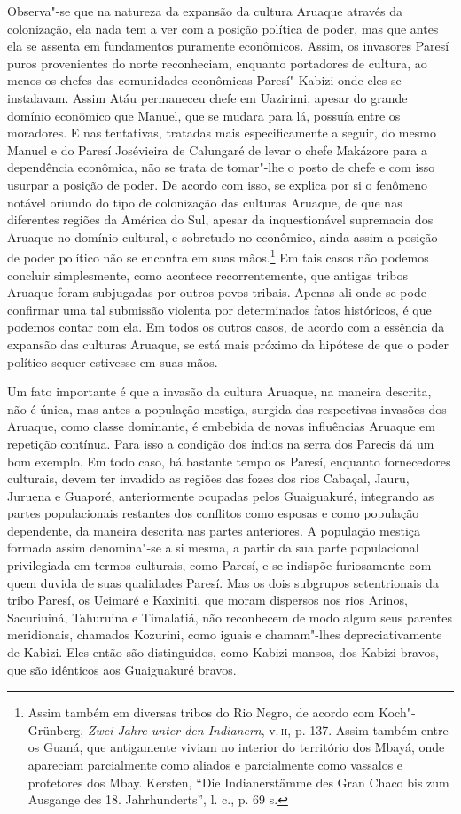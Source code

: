 Observa"-se que na natureza da expansão da cultura Aruaque através da
colonização, ela nada tem a ver com a posição política de poder, mas que
antes ela se assenta em fundamentos puramente econômicos. Assim, os
invasores Paresí puros provenientes do norte reconheciam, enquanto
portadores de cultura, ao menos os chefes das comunidades econômicas
Paresí"-Kabizi onde eles se instalavam. Assim Atáu permaneceu chefe em
Uazirimi, apesar do grande domínio econômico que Manuel, que se mudara
para lá, possuía entre os moradores. E nas tentativas, tratadas mais
especificamente a seguir, do mesmo Manuel e do Paresí Josévieira de
Calungaré de levar o chefe Makázore para a dependência econômica, não se
trata de tomar"-lhe o posto de chefe e com isso usurpar a posição de
poder. De acordo com isso, se explica por si o fenômeno notável oriundo
do tipo de colonização das culturas Aruaque, de que nas diferentes
regiões da América do Sul, apesar da inquestionável supremacia dos
Aruaque no domínio cultural, e sobretudo no econômico, ainda assim a
posição de poder político não se encontra em suas mãos.\footnote{Assim
  também em diversas tribos do Rio Negro, de acordo com Koch"-Grünberg,
  \emph{Zwei Jahre unter den Indianern}, v.\,\textsc{ii}, p. 137. Assim também
  entre os Guaná, que antigamente viviam no interior do território dos
  Mbayá, onde apareciam parcialmente como aliados e parcialmente como
  vassalos e protetores dos Mbay. Kersten, ``Die Indianerstämme des Gran
  Chaco bis zum Ausgange des 18. Jahrhunderts'', l. c., p. 69 s.} Em
tais casos não podemos concluir simplesmente, como acontece
recorrentemente, que antigas tribos Aruaque foram subjugadas por outros
povos tribais. Apenas ali onde se pode confirmar uma tal submissão
violenta por determinados fatos históricos, é que podemos contar com
ela. Em todos os outros casos, de acordo com a essência da expansão das
culturas Aruaque, se está mais próximo da hipótese de que o poder
político sequer estivesse em suas mãos.

Um fato importante é que a invasão da cultura Aruaque, na maneira
descrita, não é única, mas antes a população mestiça, surgida das
respectivas invasões dos Aruaque, como classe dominante, é embebida de
novas influências Aruaque em repetição contínua. Para isso a condição
dos índios na serra dos Parecis dá um bom exemplo. Em todo caso, há
bastante tempo os Paresí, enquanto fornecedores culturais, devem ter
invadido as regiões das fozes dos rios Cabaçal, Jauru, Juruena e
Guaporé, anteriormente ocupadas pelos Guaiguakuré, integrando as partes
populacionais restantes dos conflitos como esposas e como população
dependente, da maneira descrita nas partes anteriores. A população
mestiça formada assim denomina"-se a si mesma, a partir da sua parte
populacional privilegiada em termos culturais, como Paresí, e se
indispõe furiosamente com quem duvida de suas qualidades Paresí. Mas os
dois subgrupos setentrionais da tribo Paresí, os Ueimaré e Kaxiniti, que
moram dispersos nos rios Arinos, Sacuriuiná, Tahuruina e Timalatiá, não
reconhecem de modo algum seus parentes meridionais, chamados Kozurini,
como iguais e chamam"-lhes depreciativamente de Kabizi. Eles então são
distinguidos, como Kabizi mansos, dos Kabizi bravos, que são idênticos
aos Guaiguakuré bravos.

